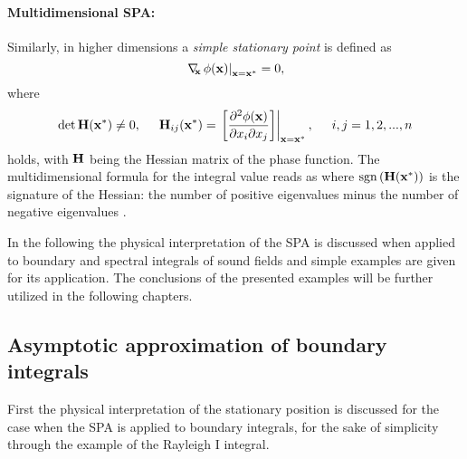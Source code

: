 \paragraph{Multidimensional SPA:} 
Similarly, in higher dimensions a \emph{simple stationary point} is defined as
\begin{equation}
\label{Eq:ndim_stat_point}
\left.
\nabla_{\!\!\mathbf{x}}\, \phi(\mathbf{x})\right|_{\mathbf{x} = \mathbf{x}^*} = 0,
\end{equation}
where 
\begin{equation}
\det \mathbf{H}(\mathbf{x}^*) \neq 0,
\hspace{5mm} 
\mathbf{H}_{ij}(\mathbf{x}^*) = \left. \left[
\frac{\partial^2 \phi(\mathbf{x})}{\partial x_i \partial x_j} 
\right] \right|_{\mathbf{x} = \mathbf{x}^*},
\hspace{5mm}
i,j = 1,2,...,n
\end{equation}
holds, with $\mathbf{H}$ being the Hessian matrix of the phase function.
The multidimensional formula for the integral value reads as
where $\mathrm{sgn}\left( \mathbf{H}(\mathbf{x}^*) \right)$ is the signature of the Hessian: the number of positive eigenvalues minus the number of negative eigenvalues \cite{Bleistein2000}.

In the following the physical interpretation of the SPA is discussed when applied to boundary and spectral integrals of sound fields and simple examples are given for its application.
The conclusions of the presented examples will be further utilized in the following chapters.

\subsection{Asymptotic approximation of boundary integrals}
\label{Sec:HS_approx:SPA_for_Rayleigh}
First the physical interpretation of the stationary position is discussed for the case when the SPA is applied to boundary integrals, for the sake of simplicity through the example of the Rayleigh I integral.
%

